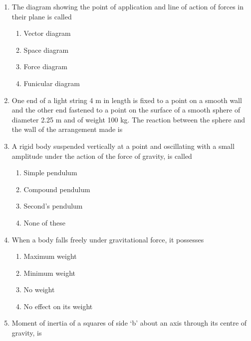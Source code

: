 \documentclass[11pt,a4paper]{article}
\begin{document}
\begin{enumerate}
\item{The diagram showing the point of application and line of action of forces in their plane is called}
\begin{enumerate}[label=\Alph*.]
\item{Vector diagram}
\item{Space diagram}
\item{Force diagram}
\item{Funicular diagram}
\end{enumerate}
\item{One end of a light string 4 m in length is fixed to a point on a smooth wall and the other end fastened to a point on the surface of a smooth sphere of diameter 2.25 m and of weight 100 kg. The reaction between the sphere and the wall of the arrangement made is}
\\
\item{A rigid body suspended vertically at a point and oscillating with a small amplitude under the action of the force of gravity, is called}
\begin{enumerate}[label=\Alph*.]
\item{Simple pendulum}
\item{Compound pendulum}
\item{Second's pendulum}
\item{None of these}
\end{enumerate}
\item{When a body falls freely under gravitational force, it possesses}
\begin{enumerate}[label=\Alph*.]
\item{Maximum weight}
\item{Minimum weight}
\item{No weight}
\item{No effect on its weight}
\end{enumerate}
\item{Moment of inertia of a squares of side `b' about an axis through its centre of gravity, is
}
\\\begin{enumerate*}[itemjoin=\qquad, label=\Alph*.]

\end{enumerate*}
\end{enumerate}
\end{document}
